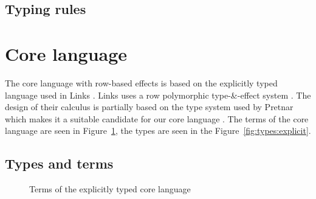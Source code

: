 \documentclass[sigplan,10pt]{acmart}\settopmatter{printfolios=true}
\begin{document}
\subsection{Typing rules}

\section{Core language}
The core language with row-based effects is based on the explicitly typed language used in Links \cite{row}. Links uses a row polymorphic type-\&-effect system . The design of their calculus is partially based on the type system used by Pretnar which makes it a suitable candidate for our core language \cite{pretnar2015introduction}. The terms of the core language are seen in Figure~\ref{fig:terms:explicit}, the types are seen in the Figure~\ref{fig:types:explicit}.

\subsection{Types and terms}

\begin{figure}[h]
\begin{center}
\end{center}
\caption{Terms of the explicitly typed core language}\label{fig:terms:explicit}
\end{figure}
\end{document}

